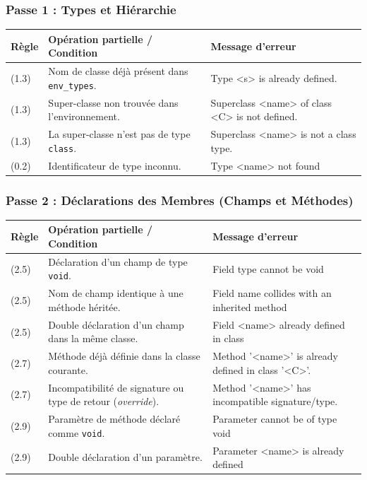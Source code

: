 \subsubsection{Passe 1 : Types et Hiérarchie}

\begin{center}
\renewcommand{\arraystretch}{1.5}
\begin{tabular}{|l|p{8cm}|p{6cm}|}
    \hline
    \rowcolor{gray!20} \textbf{Règle} & \textbf{Opération partielle / Condition} & \textbf{Message d'erreur} \\ \hline
    (1.3) & Nom de classe déjà présent dans \texttt{env\_types}. & Type <s> is already defined. \\ \hline
    (1.3) & Super-classe non trouvée dans l'environnement. & Superclass <name> of class <C> is not defined. \\ \hline
    (1.3) & La super-classe n'est pas de type \texttt{class}. & Superclass <name> is not a class type. \\ \hline
    (0.2) & Identificateur de type inconnu. & Type <name> not found \\ \hline
\end{tabular}
\end{center}

\subsubsection{Passe 2 : Déclarations des Membres (Champs et Méthodes)}

\begin{center}
\renewcommand{\arraystretch}{1.5}
\begin{tabular}{|l|p{8cm}|p{6cm}|}
    \hline
    \rowcolor{gray!20} \textbf{Règle} & \textbf{Opération partielle / Condition} & \textbf{Message d'erreur} \\ \hline
    (2.5) & Déclaration d'un champ de type \texttt{void}. & Field type cannot be void \\ \hline
    (2.5) & Nom de champ identique à une méthode héritée. & Field name collides with an inherited method \\ \hline
    (2.5) & Double déclaration d'un champ dans la même classe. & Field <name> already defined in class \\ \hline
    (2.7) & Méthode déjà définie dans la classe courante. & Method '<name>' is already defined in class '<C>'. \\ \hline
    (2.7) & Incompatibilité de signature ou type de retour (\textit{override}). & Method '<name>' has incompatible signature/type. \\ \hline
    (2.9) & Paramètre de méthode déclaré comme \texttt{void}. & Parameter cannot be of type void \\ \hline
    (2.9) & Double déclaration d'un paramètre. & Parameter <name> is already defined \\ \hline
\end{tabular}
\end{center}

